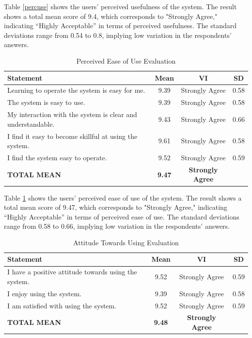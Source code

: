 	Table \ref{percuse} shows the users’ perceived usefulness of the system. The result shows a total mean score of 9.4, which corresponds to "Strongly Agree," indicating “Highly Acceptable” in terms of perceived usefulness. The standard deviations range from 0.54 to 0.8, implying low variation in the respondents’ answers.
	
	\begin{table}[h!]
		\centering
		\caption{Perceived Ease of Use Evaluation}
		\label{percease}
		\renewcommand{\arraystretch}{1.2}
		\begin{tabularx}{\linewidth}{|X|c|c|c|}
			\hline
			\textbf{Statement} & \textbf{Mean} & \textbf{VI} & \textbf{SD} \\ \hline
			Learning to operate the system is easy for me.
			& 9.39 & Strongly Agree & 0.58 \\ \hline
			The system is easy to use.
			& 9.39 & Strongly Agree & 0.58 \\ \hline
			My interaction with the system is clear and understandable.
			& 9.43 & Strongly Agree & 0.66 \\ \hline
			I find it easy to become skillful at using the system.
			& 9.61 & Strongly Agree & 0.58 \\ \hline
			I find the system easy to operate.
			& 9.52 & Strongly Agree & 0.59 \\ \hline
			\textbf{TOTAL MEAN} & \textbf{9.47} & \textbf{Strongly Agree} & \\ \hline
		\end{tabularx}
	\end{table}
	
	Table \ref{percease} shows the users’ perceived ease of use of the system. The result shows a total mean score of 9.47, which corresponds to "Strongly Agree," indicating “Highly Acceptable” in terms of perceived ease of use. The standard deviations range from 0.58 to 0.66, implying low variation in the respondents’ answers.
	
	\begin{table}[h!]
		\centering
		\caption{Attitude Towards Using Evaluation}
		\label{attuse}
		\renewcommand{\arraystretch}{1.2}
		\begin{tabularx}{\linewidth}{|X|c|c|c|}
			\hline
			\textbf{Statement} & \textbf{Mean} & \textbf{VI} & \textbf{SD} \\ \hline
			I have a positive attitude towards using the system.
			& 9.52 & Strongly Agree & 0.59 \\ \hline
			I enjoy using the system.
			& 9.39 & Strongly Agree & 0.58 \\ \hline
			I am satisfied with using the system.
			& 9.52 & Strongly Agree & 0.59 \\ \hline
			\textbf{TOTAL MEAN} & \textbf{9.48} & \textbf{Strongly Agree} & \\ \hline
		\end{tabularx}
	\end{table}
	
